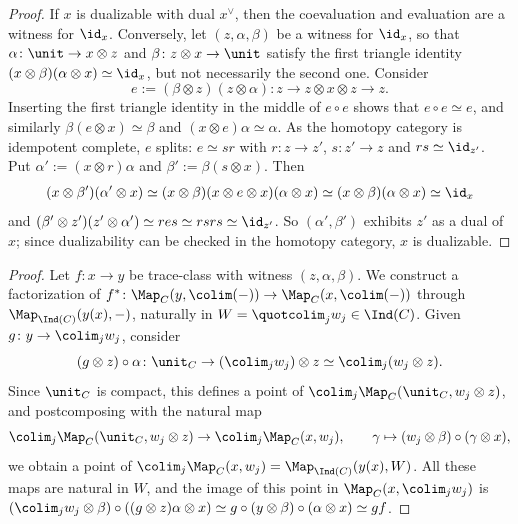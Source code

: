 	\begin{proof}
		If $x$ is dualizable with dual $x^{\vee}$, then the coevaluation and evaluation are a witness for $\id_x$. Conversely, let $(z,\alpha,\beta)$ be a witness for $\id_x$, so that $\alpha\colon \unit \to x \otimes z$ and $\beta\colon z \otimes x \to \unit$ satisfy the first triangle identity $(x \otimes \beta)(\alpha \otimes x) \simeq \id_x$, but not necessarily the second one. Consider
		\[
			e := (\beta \otimes z)(z \otimes \alpha)\colon z \to z \otimes x \otimes z \to z.
		\]
		Inserting the first triangle identity in the middle of $e \circ e$ shows that $e \circ e \simeq e$, and similarly $\beta(e \otimes x) \simeq \beta$ and $(x \otimes e)\alpha \simeq \alpha$. As the homotopy category is idempotent complete, $e$ splits: $e \simeq sr$ with $r\colon z \to z'$, $s\colon z' \to z$ and $rs \simeq \id_{z'}$. Put $\alpha' := (x \otimes r)\alpha$ and $\beta' := \beta(s \otimes x)$. Then
		\[
			(x \otimes \beta')(\alpha' \otimes x) \simeq (x \otimes \beta)(x \otimes e \otimes x)(\alpha \otimes x) \simeq (x \otimes \beta)(\alpha \otimes x) \simeq \id_x
		\]
		and $(\beta' \otimes z')(z' \otimes \alpha') \simeq r e s \simeq rsrs \simeq \id_{z'}$. So $(\alpha',\beta')$ exhibits $z'$ as a dual of $x$; since dualizability can be checked in the homotopy category, $x$ is dualizable.
	\end{proof}

	\begin{proof}
		Let $f\colon x \to y$ be trace-class with witness $(z,\alpha,\beta)$. We construct a factorization of $f^*\colon \Map_C(y,\colim(-)) \to \Map_C(x,\colim(-))$ through $\Map_{\Ind(C)}(y(x),-)$, naturally in $W = \quotcolim_j w_j \in \Ind(C)$. Given $g\colon y \to \colim_j w_j$, consider
		\[
			(g \otimes z) \circ \alpha\colon \unit_C \to (\colim_j w_j) \otimes z \simeq \colim_j (w_j \otimes z).
		\]
		Since $\unit_C$ is compact, this defines a point of $\colim_j \Map_C(\unit_C,w_j \otimes z)$, and postcomposing with the natural map
		\[
			\colim_j \Map_C(\unit_C,w_j \otimes z) \to \colim_j \Map_C(x,w_j), \qquad \gamma \mapsto (w_j \otimes \beta) \circ (\gamma \otimes x),
		\]
		we obtain a point of $\colim_j \Map_C(x,w_j) = \Map_{\Ind(C)}(y(x),W)$. All these maps are natural in $W$, and the image of this point in $\Map_C(x,\colim_j w_j)$ is $(\colim_j w_j \otimes \beta) \circ ((g \otimes z)\alpha \otimes x) \simeq g \circ (y \otimes \beta) \circ (\alpha \otimes x) \simeq gf$.
	\end{proof}

